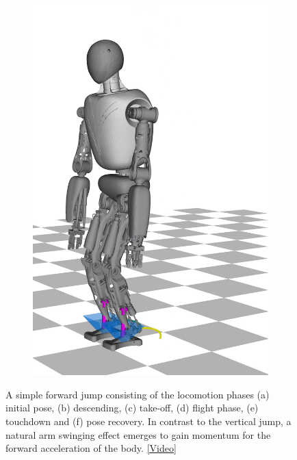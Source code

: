 \begin{figure}
\begin{subfigure}{.16\textwidth}
	\includegraphics[width=.95\linewidth]{fig/jumpForward/snaps/6x}
	\caption{}
\end{subfigure}%
\caption[A simple forward jump]{A simple forward jump consisting of the locomotion phases (a) initial pose, (b) descending, (c) take-off, (d) flight phase, (e) touchdown and (f) pose recovery. In contrast to the vertical jump, a natural arm swinging effect emerges to gain momentum for the forward acceleration of the body. \href{https://github.com/julesser/ma-thesis-simulation-results/blob/master/Jump_Forward_NoJLim/crocoddyl.mp4}{[Video]}}
\label{fig:jumpForward_Snaps}
\end{figure} 


